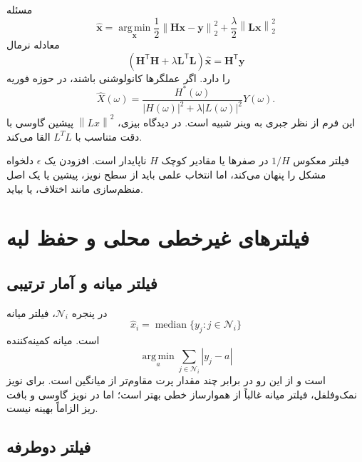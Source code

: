 \documentclass[12pt,openany,oneside]{book}
\newcommand{\norm}[1]{\left\lVert #1\right\rVert}
\newcommand{\trans}{^{\mathsf T}}
\newcommand{\vect}[1]{\bm{#1}}
\newcommand{\argmin}{\operatorname*{arg\,min}}
\newcommand{\median}{\operatorname{median}}
\begin{document}
مسئله
\begin{equation}
\widehat{\vect x}
=\argmin_{\vect x}\frac{1}{2}\norm{\vect H\vect x-\vect y}_2^2
+\frac{\lambda}{2}\norm{\vect L\vect x}_2^2
\label{eq:tikhonov}
\end{equation}
معادله نرمال
\begin{equation}
(\vect H\trans\vect H+\lambda\vect L\trans\vect L)\widehat{\vect x}
=\vect H\trans\vect y
\end{equation}
را دارد. اگر عملگرها کانولوشنی باشند، در حوزه فوریه
\begin{equation}
\widehat X(\omega)
=\frac{H^*(\omega)}{|H(\omega)|^2+\lambda|L(\omega)|^2}Y(\omega).
\label{eq:tikhonov-frequency}
\end{equation}
این فرم از نظر جبری به وینر شبیه است. در دیدگاه بیزی، \(\norm{Lx}^2\) پیشین گاوسی با دقت متناسب با \(L^TL\) القا می‌کند.

\begin{warningbox}
فیلتر معکوس \(1/H\) در صفرها یا مقادیر کوچک \(H\) ناپایدار است. افزودن یک \(\epsilon\) دلخواه مشکل را پنهان می‌کند،
اما انتخاب علمی باید از سطح نویز، پیشین یا یک اصل منظم‌سازی مانند اختلاف،  یا  بیاید.
\end{warningbox}

\section{فیلترهای غیرخطی محلی و حفظ لبه}

\subsection{فیلتر میانه و آمار ترتیبی}

در پنجره \(\mathcal N_i\)، فیلتر میانه
\begin{equation}
\widehat x_i=\median\{y_j:j\in\mathcal N_i\}
\end{equation}
است. میانه کمینه‌کننده
\begin{equation}
\argmin_a\sum_{j\in\mathcal N_i}|y_j-a|
\end{equation}
است و از این رو در برابر چند مقدار پرت مقاوم‌تر از میانگین است. برای نویز نمک‌وفلفل، فیلتر میانه غالباً از هموارساز خطی بهتر است؛
اما در نویز گاوسی و بافت ریز الزاماً بهینه نیست.

\subsection{فیلتر دوطرفه}
\end{document}
